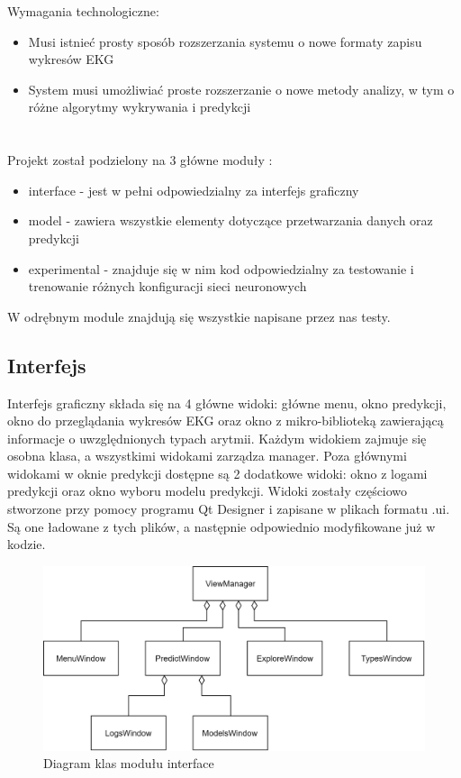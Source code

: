 \documentclass[polish,12pt]{aghthesis}
\begin{document}
Wymagania technologiczne:

\begin{itemize}
	\item Musi istnieć prosty sposób rozszerzania systemu o nowe formaty zapisu wykresów EKG
	\item System musi umożliwiać proste rozszerzanie o nowe metody analizy, w tym o różne algorytmy wykrywania i predykcji
\end{itemize}

\section{\SectionTitleRealizationAspects}
\label{sec:wybrane-aspekty-realizacji}
Projekt został podzielony na 3 główne moduły : 

\begin{itemize}
	\item interface - jest w pełni odpowiedzialny za interfejs graficzny
	\item model - zawiera wszystkie elementy dotyczące przetwarzania danych oraz predykcji
	\item experimental - znajduje się w nim kod odpowiedzialny za testowanie i trenowanie różnych konfiguracji sieci neuronowych
\end{itemize}

W odrębnym module znajdują się wszystkie napisane przez nas testy.

\subsection{Interfejs}

Interfejs graficzny składa się na 4 główne widoki: główne menu, okno predykcji, okno do przeglądania wykresów EKG oraz okno z mikro-biblioteką zawierającą informacje o uwzględnionych typach arytmii. Każdym widokiem zajmuje się osobna klasa, a wszystkimi widokami zarządza manager. Poza głównymi widokami w oknie predykcji dostępne są 2 dodatkowe widoki: okno z logami predykcji oraz okno wyboru modelu predykcji. Widoki zostały częściowo stworzone przy pomocy programu Qt Designer i zapisane w plikach formatu .ui. Są one ładowane z tych plików, a następnie odpowiednio modyfikowane już w kodzie.

\begin{figure}[H]
	\centering
	\includegraphics[width=0.8\linewidth]{interface_class_diagram.png}
	\caption{Diagram klas modułu interface}
	\label{fig:interface_diagram_class}
\end{figure}
\end{document}
